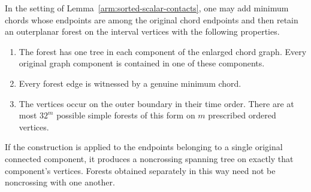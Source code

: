 \begin{lemma}
\label{arm:noncrossing-contact-forest}
In the setting of Lemma~\ref{arm:sorted-scalar-contacts}, one may add
minimum chords whose endpoints are among the original chord endpoints
and then retain an outerplanar forest on the interval vertices with the
following properties.
\begin{enumerate}[label=\textup{(\roman*)}]
 \item The forest has one tree in each component of the enlarged chord
 graph.  Every original graph component is contained in one of these
 components.
 \item Every forest edge is witnessed by a genuine minimum chord.
 \item The vertices occur on the outer boundary in their time order.
 There are at most $32^m$ possible simple forests of this form on $m$
 prescribed ordered vertices.
\end{enumerate}
If the construction is applied to the endpoints belonging to a single
original connected component, it produces a noncrossing spanning tree
on exactly that component's vertices.  Forests obtained separately in
this way need not be noncrossing with one another.
\end{lemma}

